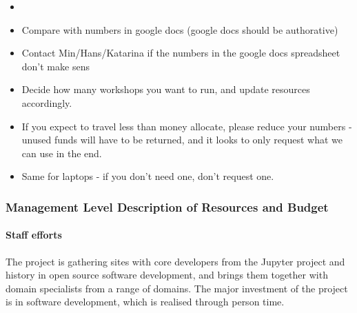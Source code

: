 \begin{itemize}
\item {}
\item Compare with numbers in google docs (google docs should be
  authorative)

\item Contact Min/Hans/Katarina if the numbers in the google docs
  spreadsheet don't make sens
\item Decide how many workshops you want to run, and update resources
  accordingly.
\item If you expect to travel less than money allocate, please reduce
  your numbers - unused funds will have to be returned, and it looks
  to only request what we can use in the end.
\item Same for laptops - if you don't need one, don't request one.
\end{itemize}



\subsubsection{Management Level Description of Resources and Budget}
\label{sect:budget-details}

\paragraph{Staff efforts}


The \TheProject project is gathering sites with core
developers from the Jupyter project and history in open source
software development, and brings them together with domain specialists
from a range of domains. The major investment of the project is in
software development, which is realised through person time.

